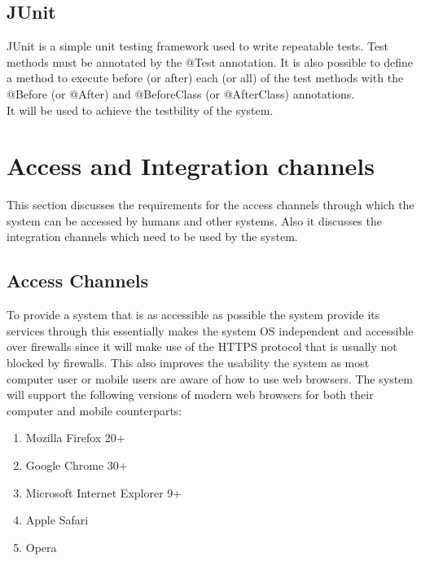 \documentclass[12pt]{article}
\begin{document}
\subsection{JUnit}
JUnit is a simple unit testing framework used to write repeatable tests. Test methods must be annotated by the @Test annotation. It is also possible to define a method to execute before (or after) each (or all) of the test methods with the @Before (or @After) and @BeforeClass (or @AfterClass) annotations. \\

It will be used to achieve the testbility of the system.

\section{Access and Integration channels}
This section discusses the requirements for the access channels through which the system can be accessed by humans and other systems. Also it discusses the integration channels which need to be used by the system. 

\subsection{Access Channels}
To provide a system that is as accessible as possible the system provide its services through this essentially makes the system OS independent and accessible over firewalls since it will make use of the HTTPS protocol that is usually not blocked by firewalls. This also improves the usability the system as most computer user or mobile users are aware of how to use web browsers. The system will support the following versions of modern web browsers for both their computer and mobile counterparts:
\begin{enumerate}
\item Mozilla Firefox 20+
\item Google Chrome 30+
\item Microsoft Internet Explorer 9+
\item Apple Safari
\item Opera
\end{enumerate}
\end{document}
